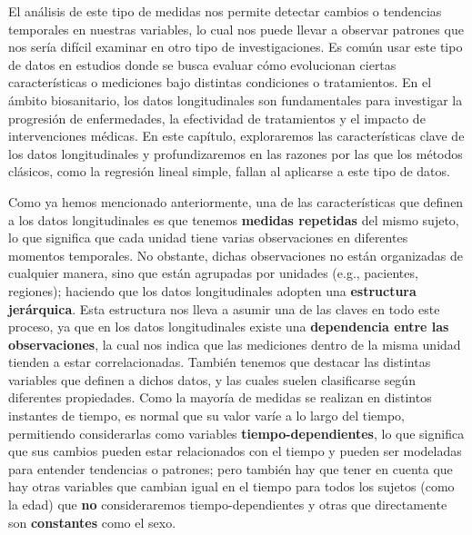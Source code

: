 \documentclass[
  letterpaper,
  DIV=11,
  numbers=noendperiod]{scrreprt}
\begin{document}
El análisis de este tipo de medidas nos permite detectar cambios o
tendencias temporales en nuestras variables, lo cual nos puede llevar a
observar patrones que nos sería difícil examinar en otro tipo de
investigaciones. Es común usar este tipo de datos en estudios donde se
busca evaluar cómo evolucionan ciertas características o mediciones bajo
distintas condiciones o tratamientos. En el ámbito biosanitario, los
datos longitudinales son fundamentales para investigar la progresión de
enfermedades, la efectividad de tratamientos y el impacto de
intervenciones médicas. En este capítulo, exploraremos las
características clave de los datos longitudinales y profundizaremos en
las razones por las que los métodos clásicos, como la regresión lineal
simple, fallan al aplicarse a este tipo de datos.

Como ya hemos mencionado anteriormente, una de las características que
definen a los datos longitudinales es que tenemos \textbf{medidas
repetidas} del mismo sujeto, lo que significa que cada unidad tiene
varias observaciones en diferentes momentos temporales. No obstante,
dichas observaciones no están organizadas de cualquier manera, sino que
están agrupadas por unidades (e.g., pacientes, regiones); haciendo que
los datos longitudinales adopten una \textbf{estructura jerárquica}.
Esta estructura nos lleva a asumir una de las claves en todo este
proceso, ya que en los datos longitudinales existe una
\textbf{dependencia entre las observaciones}, la cual nos indica que las
mediciones dentro de la misma unidad tienden a estar correlacionadas.
También tenemos que destacar las distintas variables que definen a
dichos datos, y las cuales suelen clasificarse según diferentes
propiedades. Como la mayoría de medidas se realizan en distintos
instantes de tiempo, es normal que su valor varíe a lo largo del tiempo,
permitiendo considerarlas como variables \textbf{tiempo-dependientes},
lo que significa que sus cambios pueden estar relacionados con el tiempo
y pueden ser modeladas para entender tendencias o patrones; pero también
hay que tener en cuenta que hay otras variables que cambian igual en el
tiempo para todos los sujetos (como la edad) que \textbf{no}
consideraremos tiempo-dependientes y otras que directamente son
\textbf{constantes} como el sexo.
\end{document}

